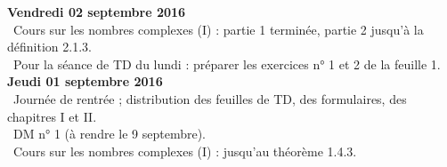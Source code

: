 \documentclass[12pt,a4paper]{article}
\begin{document}
\noindent\textbf{Vendredi 02 septembre 2016}\\
\bu\ Cours sur les nombres complexes (I) : partie 1 terminée, partie 2 jusqu'à la définition 2.1.3.\\
\bu\ Pour la séance de TD du lundi : préparer les exercices n° 1 et 2 de la feuille 1. \vspace{.4cm}\\

\noindent\textbf{Jeudi 01 septembre 2016}\\
\bu\ Journée de rentrée ; distribution des feuilles de TD, des formulaires, des
chapitres I et II.  \\
\bu\ DM n° 1 (à
rendre le 9 septembre). \\
\bu\ Cours sur les nombres complexes (I) : jusqu'au théorème 1.4.3. 
\label{end}
\end{document}

